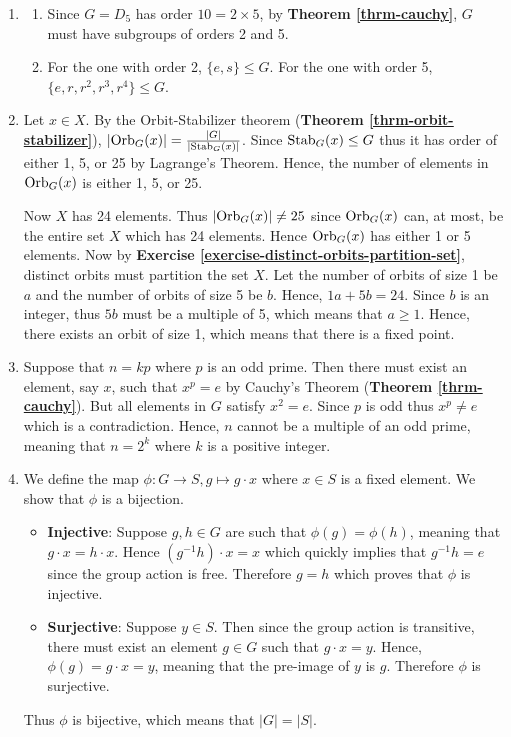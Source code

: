 \begin{enumerate}
    \item \begin{enumerate}[label=(\alph*)]
        \item Since $G = D_5$ has order $10 = 2 \times 5$, by \textbf{Theorem \ref{thrm-cauchy}}, $G$ must have subgroups of orders 2 and 5.
        \item For the one with order 2, $\{e, s\} \leq G$. For the one with order 5, $\{e, r, r^2, r^3, r^4\} \leq G$.
    \end{enumerate}

    \item Let $x \in X$. By the Orbit-Stabilizer theorem (\textbf{Theorem \ref{thrm-orbit-stabilizer}}), $|\mathrm{Orb}_{G}(x)| = \frac{|G|}{|\mathrm{Stab}_{G}(x)|}$. Since $\mathrm{Stab}_{G}(x) \leq G$ thus it has order of either 1, 5, or 25 by Lagrange's Theorem. Hence, the number of elements in $\mathrm{Orb}_{G}(x)$ is either 1, 5, or 25.

    Now $X$ has 24 elements. Thus $|\mathrm{Orb}_{G}(x)| \neq 25$ since $\mathrm{Orb}_{G}(x)$ can, at most, be the entire set $X$ which has 24 elements. Hence $\mathrm{Orb}_{G}(x)$ has either 1 or 5 elements. Now by \textbf{Exercise \ref{exercise-distinct-orbits-partition-set}}, distinct orbits must partition the set $X$. Let the number of orbits of size 1 be $a$ and the number of orbits of size 5 be $b$. Hence, $1a + 5b = 24$. Since $b$ is an integer, thus $5b$ must be a multiple of 5, which means that $a \geq 1$. Hence, there exists an orbit of size 1, which means that there is a fixed point.

    \item Suppose that $n = kp$ where $p$ is an odd prime. Then there must exist an element, say $x$, such that $x^p = e$ by Cauchy's Theorem (\textbf{Theorem \ref{thrm-cauchy}}). But all elements in $G$ satisfy $x^2 = e$. Since $p$ is odd thus $x^p \neq e$ which is a contradiction. Hence, $n$ cannot be a multiple of an odd prime, meaning that $n = 2^k$ where $k$ is a positive integer.

    \item We define the map $\phi: G \to S, g \mapsto g \cdot x$ where $x \in S$ is a fixed element. We show that $\phi$ is a bijection.
    \begin{itemize}
        \item \textbf{Injective}: Suppose $g, h \in G$ are such that $\phi(g) = \phi(h)$, meaning that $g\cdot x = h\cdot x$. Hence $(g^{-1}h) \cdot x = x$ which quickly implies that $g^{-1}h = e$ since the group action is free. Therefore $g = h$ which proves that $\phi$ is injective.
        \item \textbf{Surjective}: Suppose $y \in S$. Then since the group action is transitive, there must exist an element $g \in G$ such that $g \cdot x = y$. Hence, $\phi(g) = g\cdot x = y$, meaning that the pre-image of $y$ is $g$. Therefore $\phi$ is surjective.
    \end{itemize}
    Thus $\phi$ is bijective, which means that $|G| = |S|$.


\end{enumerate}
